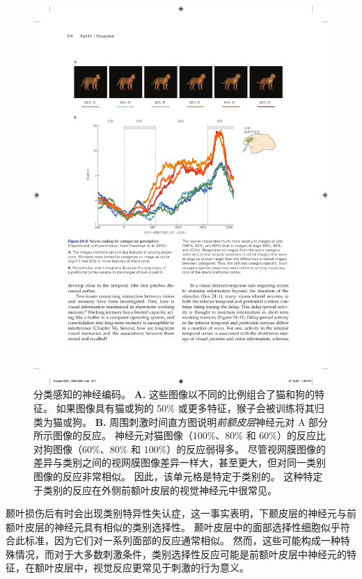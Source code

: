 \begin{figure}[htbp]
	\centering
	\includegraphics[width=1.0\linewidth]{chap24/fig_24_8}
	\caption{分类感知的神经编码。
		\textbf{A.} 这些图像以不同的比例组合了猫和狗的特征。
		如果图像具有猫或狗的 50\% 或更多特征，猴子会被训练将其归类为猫或狗。
		\textbf{B.} 周围刺激时间直方图说明\textit{前额皮层}神经元对 A 部分所示图像的反应。
		神经元对猫图像（100\%、80\% 和 60\%）的反应比对狗图像（60\%、80\% 和 100\%）的反应弱得多。
		尽管视网膜图像的差异与类别之间的视网膜图像差异一样大，甚至更大，但对同一类别图像的反应非常相似。
		因此，该单元格是特定于类别的。
		这种特定于类别的反应在外侧前额叶皮层的视觉神经元中很常见。}
	\label{fig:24_8}
\end{figure}


颞叶损伤后有时会出现类别特异性失认症，这一事实表明，下颞皮层的神经元与前额叶皮层的神经元具有相似的类别选择性。
颞叶皮层中的面部选择性细胞似乎符合此标准，因为它们对一系列面部的反应通常相似。
然而，这些可能构成一种特殊情况，而对于大多数刺激条件，类别选择性反应可能是前额叶皮层中神经元的特征，在额叶皮层中，视觉反应更常见于刺激的行为意义。



